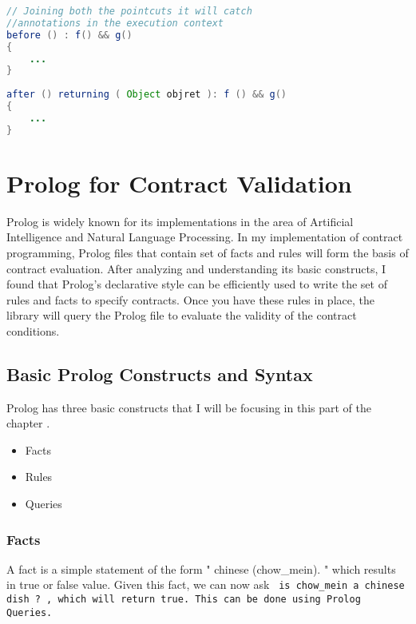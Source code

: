 \begin{minipage}{\linewidth}       
\begin{lstlisting}[frame=single, language=Java, caption={Pointcut Composition and before-after routines}, label={beforeafteroutines}, captionpos=b, breaklines=true, showstringspaces=false]
// Joining both the pointcuts it will catch 
//annotations in the execution context
before () : f() && g() 
{
	...
}
	
after () returning ( Object objret ): f () && g()
{
	...
}
\end{lstlisting}
\end{minipage} 


\section{Prolog for Contract Validation}

Prolog is widely known for its implementations in the area of Artificial Intelligence and Natural Language Processing. In my implementation of contract programming, Prolog files that contain set of facts and rules will form the basis of contract evaluation. After analyzing and understanding its basic constructs, I found that Prolog's declarative style can be efficiently used to write the set of rules and facts to specify contracts. Once you have these rules in place, the library will query the Prolog file to evaluate the validity of the contract conditions.

\subsection{Basic Prolog Constructs and Syntax}

Prolog has three basic constructs that I will be focusing in this part of the chapter \cite{LearnProlog:online}.

\begin{itemize}
\item Facts
\item Rules
\item Queries
\end{itemize}

\subsubsection{Facts}
A fact is a simple statement of the form " chinese (chow\_mein). " which results in true or false value. Given this fact, we can now ask \tt{ is chow\_mein a chinese dish ?} , which will return true. This can be done using Prolog Queries.

